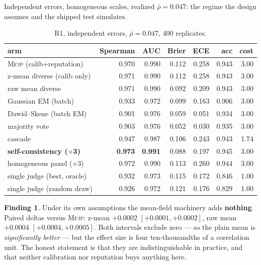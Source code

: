\documentclass[11pt]{article}
\theoremstyle{definition}
\newtheorem{finding}{Finding}
\newcommand{\rhobar}{\ensuremath{\bar{\rho}}}
\newcommand{\mfjp}{\textsc{Mfjp}}
\begin{document}
Independent errors, homogeneous scales, realized $\rhobar = 0.047$: the regime the design
assumes and the shipped test simulates.

\begin{table}[H]\centering
\begin{tabular}{lrrrrrr}
\toprule
arm & Spearman & AUC & Brier & ECE & acc & cost \\
\midrule
\mfjp{} (calib+reputation)      & 0.970 & 0.990 & 0.112 & 0.258 & 0.943 & 3.00 \\
z-mean diverse (calib only)     & 0.971 & 0.990 & 0.112 & 0.258 & 0.943 & 3.00 \\
raw mean diverse                & 0.971 & 0.990 & 0.092 & 0.209 & 0.943 & 3.00 \\
Gaussian EM (batch)             & 0.933 & 0.972 & 0.099 & 0.163 & 0.906 & 3.00 \\
Dawid--Skene (batch EM)         & 0.901 & 0.976 & 0.059 & 0.051 & 0.934 & 3.00 \\
majority vote                   & 0.903 & 0.976 & 0.052 & 0.030 & 0.935 & 3.00 \\
cascade                         & 0.947 & 0.987 & 0.106 & 0.243 & 0.943 & 1.74 \\
\textbf{self-consistency ($\times$3)} & \textbf{0.973} & \textbf{0.991} & 0.088 & 0.197 & 0.945 & 3.00 \\
homogeneous panel ($\times$3)   & 0.972 & 0.990 & 0.113 & 0.260 & 0.944 & 3.00 \\
single judge (best, oracle)     & 0.932 & 0.973 & 0.115 & 0.172 & 0.846 & 1.00 \\
single judge (random draw)      & 0.926 & 0.972 & 0.121 & 0.176 & 0.829 & 1.00 \\
\bottomrule
\end{tabular}
\caption{R1, independent errors, $\rhobar=0.047$, 400 replicates.}
\end{table}

\begin{finding}
Under its own assumptions the mean-field machinery adds \textbf{nothing}. Paired deltas versus
\mfjp{}: z-mean $+0.0002$ $[+0.0001,+0.0002]$, raw mean $+0.0004$ $[+0.0004,+0.0005]$. Both
intervals exclude zero --- so the plain mean is \emph{significantly better} --- but the effect
size is four ten-thousandths of a correlation unit. The honest statement is that they are
indistinguishable in practice, and that neither calibration nor reputation buys anything here.
\end{finding}
\end{document}
